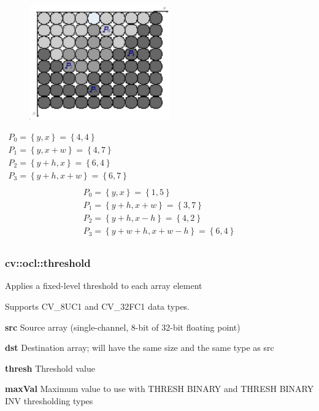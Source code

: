 \documentclass{article}
\begin{document}
\begin{figure}[htbp]
\centerline{\includegraphics[width=2.38in,height=1.95in]{User3.pdf}}
\label{fig3}
\end{figure}
$\begin{array}{l}
 P_0 =\left\{ {y,x} \right\}=\left\{ {4,4} \right\} \\
 P_1 =\left\{ {y,x+w} \right\}=\left\{ {4,7} \right\} \\
 P_2 =\left\{ {y+h,x} \right\}=\left\{ {6,4} \right\} \\
 P_3 =\left\{ {y+h,x+w} \right\}=\left\{ {6,7} \right\} \\
 \end{array}$
\[
\begin{array}{l}
 P_0 =\left\{ {y,x} \right\}=\left\{ {1,5} \right\} \\
 P_1 =\left\{ {y+h,x+w} \right\}=\left\{ {3,7} \right\} \\
 P_2 =\left\{ {y+h,x-h} \right\}=\left\{ {4,2} \right\} \\
 P_3 =\left\{ {y+w+h,x+w-h} \right\}=\left\{ {6,4} \right\} \\
 \end{array}
\]
\newpage

\subsubsection{cv::ocl::threshold }
\label{subsubsec:mylabel50}
Applies a fixed-level threshold to each array element

Supports CV{\_}8UC1 and CV{\_}32FC1 data types.

\textbf{src }Source array (single-channel, 8-bit of 32-bit floating point)

\textbf{dst }Destination array; will have the same size and the same type as
src

\textbf{thresh }Threshold value

\textbf{maxVal }Maximum value to use with THRESH BINARY and THRESH BINARY
INV thresholding types
\end{document}
